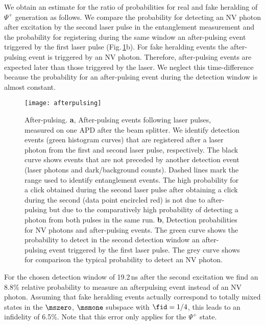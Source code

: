 We obtain an estimate for the ratio of probabilities for real and fake heralding of $\Psi^+$ generation as follows. We compare the probability for detecting an NV photon after excitation by the second laser pulse in the entanglement measurement and the probability for registering during the same window an after-pulsing event triggered by the first laser pulse (Fig.\,\ref{fig:afterpulsing}b). For fake heralding events the after-pulsing event is triggered by an NV photon. Therefore, after-pulsing events are expected later than those triggered by the laser. We neglect this time-difference because the probability for an after-pulsing event during the detection window is almost constant.

\begin{figure}[h]
    \centering
    \texttt{[image: afterpulsing]}
    \caption{After-pulsing. {\bf a}, After-pulsing events following laser pulses, measured on one APD after the beam splitter. We identify detection events (green histogram curves) that are registered after a laser photon from the first and second laser pulse, respectively. The black curve shows events that are not preceded by another detection event (laser photons and dark/background counts). Dashed lines mark the range used to identify entanglement events. The high probability for a click obtained during the second laser pulse after obtaining a click during the second (data point encircled red) is not due to after-pulsing but due to the comparatively high probability of detecting a photon from both pulses in the same run. {\bf b}, Detection probabilities for NV photons and after-pulsing events. The green curve shows the probability to detect in the second detection window an after-pulsing event triggered by the first laser pulse. The grey curve shows for comparison the typical probability to detect an NV photon.}
	\label{fig:afterpulsing}
\end{figure}

For the chosen detection window of 19.2\,ns after the second excitation we find an 8.8\% relative probability to measure an afterpulsing event instead of an NV photon. Assuming that fake heralding events actually correspond to totally mixed states in the $\mszero$, $\msmone$ subspace with $\fid=1/4$, this leads to an infidelity of 6.5\%. Note that this error only applies for the $\Psi^+$ state.


